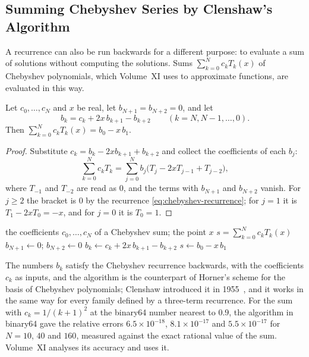 \subsection{Summing Chebyshev Series by Clenshaw's Algorithm}

A recurrence can also be run backwards for a different purpose: to evaluate a sum of solutions without computing the solutions. Sums $\sum_{k=0}^Nc_kT_k(x)$ of Chebyshev polynomials, which Volume~XI uses to approximate functions, are evaluated in this way.

\begin{proposition}
\label{prop:clenshaw}
Let $c_0,\ldots,c_N$ and $x$ be real, let $b_{N+1}=b_{N+2}=0$, and let
\[
b_k=c_k+2x\,b_{k+1}-b_{k+2}\qquad(k=N,N-1,\ldots,0).
\]
Then $\sum_{k=0}^Nc_kT_k(x)=b_0-x\,b_1$.
\end{proposition}

\begin{proof}
Substitute $c_k=b_k-2xb_{k+1}+b_{k+2}$ and collect the coefficients of each $b_j$:
\[
\sum_{k=0}^Nc_kT_k=\sum_{j=0}^{N}b_j\bigl(T_j-2xT_{j-1}+T_{j-2}\bigr),
\]
where $T_{-1}$ and $T_{-2}$ are read as $0$, and the terms with $b_{N+1}$ and $b_{N+2}$ vanish. For $j\ge2$ the bracket is $0$ by the recurrence \eqref{eq:chebyshev-recurrence}; for $j=1$ it is $T_1-2xT_0=-x$, and for $j=0$ it is $T_0=1$.
\end{proof}

\begin{algorithm}
\begin{algorithmic}[1]
\Require the coefficients $c_0,\ldots,c_N$ of a Chebyshev sum; the point $x$
\Ensure $s=\sum_{k=0}^Nc_kT_k(x)$
\State $b_{N+1}\gets0$; $b_{N+2}\gets0$
  \State $b_k\gets c_k+2x\,b_{k+1}-b_{k+2}$ 
\EndFor
\State \Return $s\gets b_0-x\,b_1$
\end{algorithmic}
\caption{Clenshaw's algorithm for a sum of Chebyshev polynomials (\cref{prop:clenshaw}). Each coefficient costs one multiplication by the precomputed $2x$ and two additions, and the values $T_k(x)$ are never formed.\label{alg:clenshaw}}
\end{algorithm}

The numbers $b_k$ satisfy the Chebyshev recurrence backwards, with the coefficients $c_k$ as inputs, and the algorithm is the counterpart of Horner's scheme for the basis of Chebyshev polynomials; Clenshaw introduced it in 1955~\cite{clenshaw1955}, and it works in the same way for every family defined by a three-term recurrence. For the sum with $c_k=1/(k+1)^2$ at the binary64 number nearest to $0.9$, the algorithm in binary64 gave the relative errors $6.5\times10^{-18}$, $8.1\times10^{-17}$ and $5.5\times10^{-17}$ for $N=10$, $40$ and $160$, measured against the exact rational value of the sum. Volume~XI analyses its accuracy and uses it.

